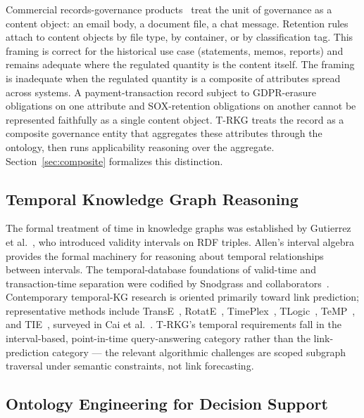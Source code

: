 \documentclass{ieeeaccess}
\begin{document}
Commercial records-governance products~\cite{purview} treat the unit of governance as a content object: an email body, a document file, a chat message. Retention rules attach to content objects by file type, by container, or by classification tag. This framing is correct for the historical use case (statements, memos, reports) and remains adequate where the regulated quantity is the content itself. The framing is inadequate when the regulated quantity is a composite of attributes spread across systems. A payment-transaction record subject to GDPR-erasure obligations on one attribute and SOX-retention obligations on another cannot be represented faithfully as a single content object. T-RKG treats the record as a composite governance entity that aggregates these attributes through the ontology, then runs applicability reasoning over the aggregate. Section~\ref{sec:composite} formalizes this distinction.

\subsection{Temporal Knowledge Graph Reasoning}

The formal treatment of time in knowledge graphs was established by Gutierrez et al.~\cite{gutierrez2007}, who introduced validity intervals on RDF triples. Allen's interval algebra~\cite{allen1983} provides the formal machinery for reasoning about temporal relationships between intervals. The temporal-database foundations of valid-time and transaction-time separation were codified by Snodgrass and collaborators~\cite{snodgrass1995,jensen1997}. Contemporary temporal-KG research is oriented primarily toward link prediction; representative methods include TransE~\cite{transe}, RotatE~\cite{rotate}, TimePlex~\cite{timeplex}, TLogic~\cite{tlogic}, TeMP~\cite{temp}, and TIE~\cite{tie}, surveyed in Cai et al.~\cite{cai2023}. T-RKG's temporal requirements fall in the interval-based, point-in-time query-answering category rather than the link-prediction category --- the relevant algorithmic challenges are scoped subgraph traversal under semantic constraints, not link forecasting.

\subsection{Ontology Engineering for Decision Support}
\end{document}
